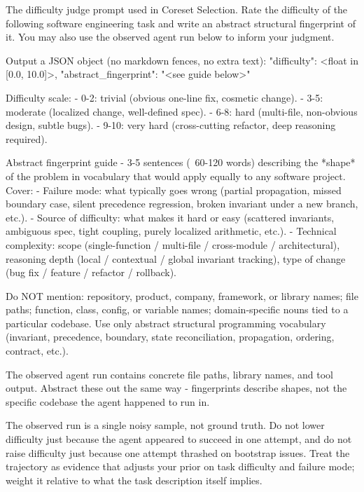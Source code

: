 \begin{promptbox}{The difficulty judge prompt used in Coreset Selection.}
Rate the difficulty of the following software engineering task and write
an abstract structural fingerprint of it. You may also use the observed
agent run below to inform your judgment.

Output a JSON object (no markdown fences, no extra text):
{
  "difficulty": <float in [0.0, 10.0]>,
  "abstract_fingerprint": "<see guide below>"
}

Difficulty scale:
- 0-2: trivial (obvious one-line fix, cosmetic change).
- 3-5: moderate (localized change, well-defined spec).
- 6-8: hard (multi-file, non-obvious design, subtle bugs).
- 9-10: very hard (cross-cutting refactor, deep reasoning required).

Abstract fingerprint guide - 3-5 sentences (~60-120 words) describing
the *shape* of the problem in vocabulary that would apply equally to
any software project. Cover:
- Failure mode: what typically goes wrong (partial propagation,
  missed boundary case, silent precedence regression, broken invariant
  under a new branch, etc.).
- Source of difficulty: what makes it hard or easy (scattered
  invariants, ambiguous spec, tight coupling, purely localized
  arithmetic, etc.).
- Technical complexity: scope (single-function / multi-file /
  cross-module / architectural), reasoning depth (local / contextual /
  global invariant tracking), type of change (bug fix / feature /
  refactor / rollback).

Do NOT mention: repository, product, company, framework, or library
names; file paths; function, class, config, or variable names;
domain-specific nouns tied to a particular codebase. Use only abstract
structural programming vocabulary (invariant, precedence, boundary,
state reconciliation, propagation, ordering, contract, etc.).

The observed agent run contains concrete file paths, library names, and
tool output. Abstract these out the same way - fingerprints describe
shapes, not the specific codebase the agent happened to run in.

The observed run is a single noisy sample, not ground truth. Do not
lower difficulty just because the agent appeared to succeed in one
attempt, and do not raise difficulty just because one attempt thrashed
on bootstrap issues. Treat the trajectory as evidence that adjusts your
prior on task difficulty and failure mode; weight it relative to what
the task description itself implies.


\end{promptbox}
